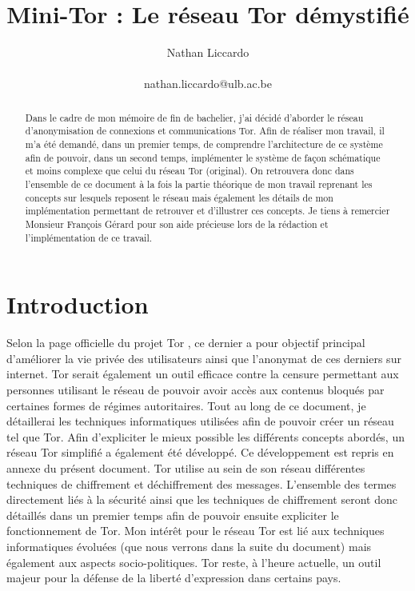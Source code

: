 \documentclass[letterpaper]{article}
\title{Mini-Tor : Le réseau Tor démystifié}
\author {Nathan Liccardo \\ \mbox{} \\ nathan.liccardo@ulb.ac.be}
\begin{document}
\maketitle

\begin{abstract}
Dans le cadre de mon mémoire de fin de bachelier, j'ai décidé d'aborder le réseau d'anonymisation de connexions et communications Tor. Afin de réaliser mon travail, il m'a été demandé, dans un premier temps, de comprendre l'architecture de ce système afin de pouvoir, dans un second temps, implémenter le système de façon schématique et moins complexe que celui du réseau Tor (original). On retrouvera donc dans l'ensemble de ce document à la fois la partie théorique de mon travail reprenant les concepts sur lesquels reposent le réseau mais également les détails de mon implémentation permettant de retrouver et d'illustrer ces concepts. Je tiens à remercier Monsieur François Gérard pour son aide précieuse lors de la rédaction et l'implémentation de ce travail. 
\end{abstract}


\section{Introduction}
Selon la page officielle du projet Tor \cite{ref1}, ce dernier a pour objectif principal d'améliorer la vie privée des utilisateurs ainsi que l'anonymat de ces derniers sur internet. Tor serait également un outil efficace contre la censure permettant aux personnes utilisant le réseau de pouvoir avoir accès aux contenus bloqués par certaines formes de régimes autoritaires. Tout au long de ce document, je détaillerai les techniques informatiques utilisées afin de pouvoir créer un réseau tel que Tor. Afin d'expliciter le mieux possible les différents concepts abordés, un réseau Tor simplifié a également été développé. Ce développement est repris en annexe du présent document. Tor utilise au sein de son réseau différentes techniques de chiffrement et déchiffrement des messages. L'ensemble des termes directement liés à la sécurité ainsi que les techniques de chiffrement seront donc détaillés dans un premier temps afin de pouvoir ensuite expliciter le fonctionnement de Tor. Mon intérêt pour le réseau Tor est lié aux techniques informatiques évoluées (que nous verrons dans la suite du document) mais également aux aspects socio-politiques. Tor reste, à l'heure actuelle, un outil majeur pour la défense de la liberté d'expression dans certains pays. \\
\end{document}
